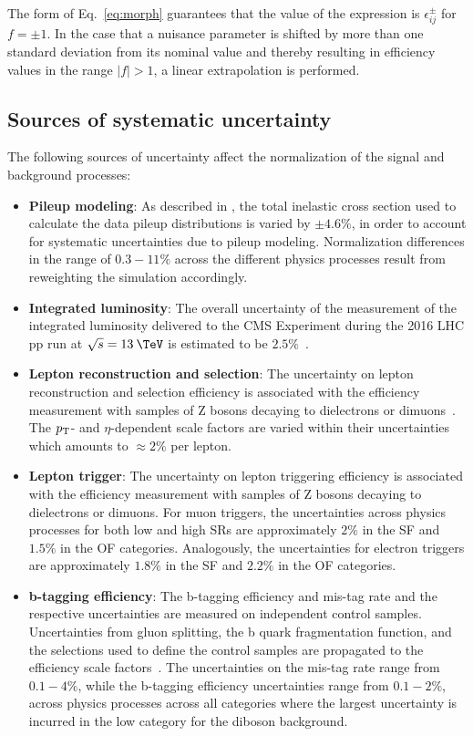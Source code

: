 The form of Eq.~\ref{eq:morph} guarantees that the value of the expression is $\epsilon^{\pm}_{ij}$ for $f=\pm 1$. In the case that a nuisance parameter is shifted by more than one standard deviation from its nominal value and thereby resulting in efficiency values in the range $|f|>1$, a linear extrapolation is performed.

\subsection{Sources of systematic uncertainty}
\label{subsec:sources}
The following sources of uncertainty affect the normalization of the signal and background processes: 

\begin{itemize}
  \item \textbf{Pileup modeling}: As described in , the total inelastic cross section used to calculate the data pileup distributions is varied by $\pm4.6\%$, in order to account for systematic uncertainties due to pileup modeling. Normalization differences in the range of $0.3-11\%$ across the different physics processes result from reweighting the simulation accordingly.
  \item \textbf{Integrated luminosity}: The overall uncertainty of the measurement of the integrated luminosity delivered to the CMS Experiment during the 2016 LHC pp run at $\sqrt{s}=13\:\TeV$ is estimated to be $2.5\%$~\cite{CMS-PAS-LUM-17-001}.
  \item \textbf{Lepton reconstruction and selection}: The uncertainty on lepton reconstruction and selection efficiency is associated with the efficiency measurement with samples of Z bosons decaying to dielectrons or dimuons~\cite{CMS:2011aa}. The $p_{\mathrm{T}}$- and $\eta$-dependent scale factors are varied within their uncertainties which amounts to $\approx 2\%$ per lepton.
  \item \textbf{Lepton trigger}: The uncertainty on lepton triggering efficiency is associated with the efficiency measurement with samples of Z bosons decaying to dielectrons or dimuons. For muon triggers, the uncertainties across physics processes for both low and high \mttll SRs are approximately $2\%$ in the SF and $1.5\%$ in the OF categories. Analogously, the uncertainties for electron triggers are approximately $1.8\%$ in the SF and $2.2\%$ in the OF categories. 
  \item \textbf{b-tagging efficiency}: The b-tagging efficiency and mis-tag rate and the respective uncertainties are measured on independent control samples. Uncertainties from gluon splitting, the b quark fragmentation function, and the selections used to define the control samples are propagated to the efficiency scale factors~\cite{CMS-PAS-BTV-15-001}. The uncertainties on the mis-tag rate range from $0.1-4\%$, while the b-tagging efficiency uncertainties range from $0.1-2\%$, across physics processes across all categories where the largest uncertainty is incurred in the low \mttll category for the diboson background.

\end{itemize}

